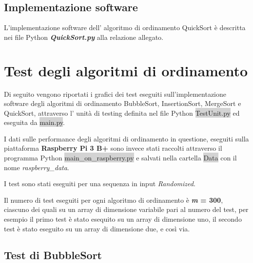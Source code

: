 \documentclass{article}
\begin{document}
		\subsection{Implementazione software}
			L'implementazione software dell' algoritmo di ordinamento QuickSort è descritta nei file Python \textbf{\textit{QuickSort.py}} alla relazione allegato.

	\newpage
	\section{Test degli algoritmi di ordinamento}
		Di seguito vengono riportati i grafici dei test eseguiti sull'implementazione software degli algoritmi di ordinamento BubbleSort, InsertionSort, MergeSort e QuickSort, attraverso l' unità di testing definita nel file Python \colorbox{lightgray}{TestUnit.py} ed eseguita da \colorbox{lightgray}{main.py}.
		
		I dati sulle performance degli algoritmi di ordinamento in questione, eseguiti sulla piattaforma \textbf{Raspberry Pi 3 B+} sono invece stati raccolti attraverso il programma Python \colorbox{lightgray}{main\_on\_raspberry.py} e salvati nella cartella \colorbox{lightgray}{Data} con il nome \textit{raspberry\_data}.
		
		I test sono stati eseguiti per una sequenza in input \textit{Randomized}.
		
		Il numero di test eseguiti per ogni algoritmo di ordinamento è \textbf{\textit{m} = 300}, ciascuno dei quali su un array di dimensione variabile pari al numero del test, per esempio il primo test è stato esequito su un array di dimensione uno, il secondo test è stato eseguito su un array di dimensione due, e così via.

		\newpage
		\subsection{Test di BubbleSort}
\end{document}
